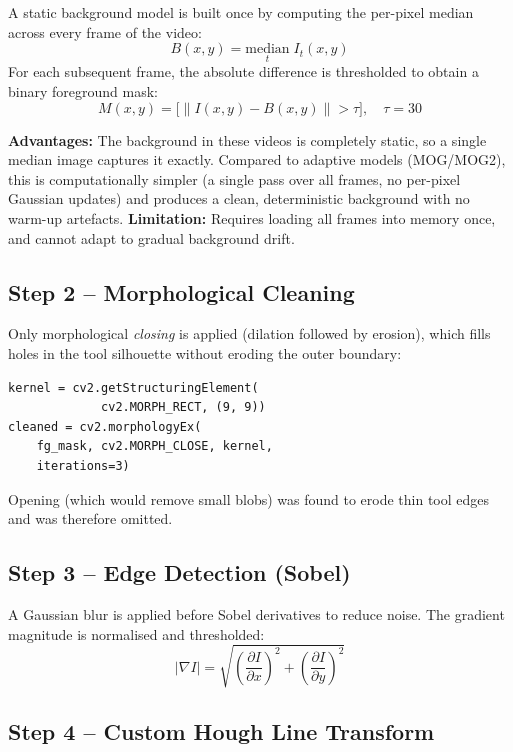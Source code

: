 \documentclass[conference, twocolumn]{IEEEtran}
\begin{document}
A static background model is built once by computing the per-pixel median across every frame of the video:
\begin{equation}
    B(x,y) = \underset{t}{\text{median}}\; I_t(x,y)
\end{equation}
For each subsequent frame, the absolute difference is thresholded to obtain a binary foreground mask:
\begin{equation}
    M(x,y) = \bigl[\|I(x,y) - B(x,y)\| > \tau\bigr], \quad \tau = 30
\end{equation}

\textbf{Advantages:} The background in these videos is completely static, so a single median image captures it exactly. Compared to adaptive models (MOG/MOG2), this is computationally simpler (a single pass over all frames, no per-pixel Gaussian updates) and produces a clean, deterministic background with no warm-up artefacts. \textbf{Limitation:} Requires loading all frames into memory once, and cannot adapt to gradual background drift.

\subsection{Step 2 -- Morphological Cleaning}

Only morphological \emph{closing} is applied (dilation followed by erosion), which fills holes in the tool silhouette without eroding the outer boundary:
\begin{lstlisting}
kernel = cv2.getStructuringElement(
             cv2.MORPH_RECT, (9, 9))
cleaned = cv2.morphologyEx(
    fg_mask, cv2.MORPH_CLOSE, kernel,
    iterations=3)
\end{lstlisting}
Opening (which would remove small blobs) was found to erode thin tool edges and was therefore omitted.

\subsection{Step 3 -- Edge Detection (Sobel)}

A Gaussian blur is applied before Sobel derivatives to reduce noise. The gradient magnitude is normalised and thresholded:
\begin{equation}
    |\nabla I| = \sqrt{\left(\frac{\partial I}{\partial x}\right)^2 + \left(\frac{\partial I}{\partial y}\right)^2}
\end{equation}

\subsection{Step 4 -- Custom Hough Line Transform}
\end{document}
